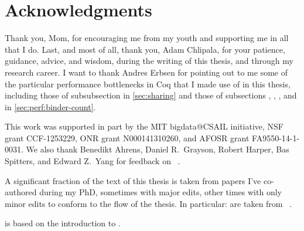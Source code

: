 % 

\cleardoublepage

\section*{Acknowledgments}

Thank you, Mom, for encouraging me from my youth and supporting me in all that I do.  Last, and most of all, thank you, Adam Chlipala, for your patience, guidance, advice, and wisdom, during the writing of this thesis, and through my research career.
I want to thank Andres Erbsen for pointing out to me some of the particular performance bottlenecks in Coq that I made use of in this thesis, including those of subsubsection  in \autoref{sec:sharing} and those of subsections , , , and  in \autoref{sec:perf:binder-count}.

This work was supported in part by the MIT bigdata@CSAIL initiative, NSF grant CCF-1253229, ONR grant N000141310260, and AFOSR grant FA9550-14-1-0031.
We also thank Benedikt Ahrens, Daniel R.~Grayson, Robert Harper, Bas Spitters, and Edward Z.~Yang for feedback on ~\cite{category-coq-experience}.

A significant fraction of the text of this thesis is taken from papers I've co-authored during my PhD, sometimes with major edits, other times with only minor edits to conform to the flow of the thesis.
In particular:
 are taken from ~\cite{category-coq-experience}.

 is based on the introduction to \textcite{reification-by-parametricity}.

